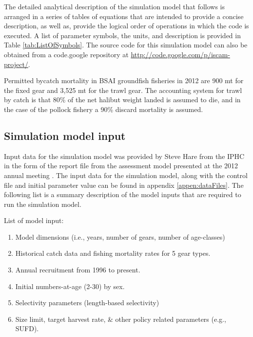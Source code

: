 The detailed analytical description of the simulation model that follows is arranged in a series of tables of equations that are intended to provide a concise description, as well as, provide the logical order of operations in which the code is executed.  A list of parameter symbols, the units, and description is provided in Table \ref{tab:ListOfSymbols}.  The source code for this simulation model can also be obtained from a code.google repository at \url{http://code.google.com/p/iscam-project/}.


Permitted bycatch mortality in BSAI groundfish fisheries in 2012 are 900 mt for the fixed gear and 3,525 mt for the trawl gear.  The accounting system for trawl by catch is that 80\% of the net halibut weight landed is assumed to die, and in the case of the pollock fishery a 90\% discard mortality is assumed.

\subsection{Simulation model input} %
\label{sub:simulation_model_input}

Input data for the simulation model was provided by Steve Hare from the IPHC in the form of the report file from the assessment model presented at the 2012 annual meeting \citep{Hare2012Rara}.  The input data for the simulation model, along with the control file and initial parameter value can be found in appendix \ref{appen:dataFiles}.  The following list is a summary description of the model inputs that are required to run the simulation model.

List of model input:
\begin{enumerate}
	\item Model dimensions (i.e., years, number of gears, number of age-classes)
	\item Historical catch data and fishing mortality rates for 5 gear types.
	\item Annual recruitment from 1996 to present.
	\item Initial numbers-at-age (2-30) by sex.
	\item Selectivity parameters (length-based selectivity)
	\item Size limit, target harvest rate, \& other policy related parameters (e.g., SUFD).
\end{enumerate}

